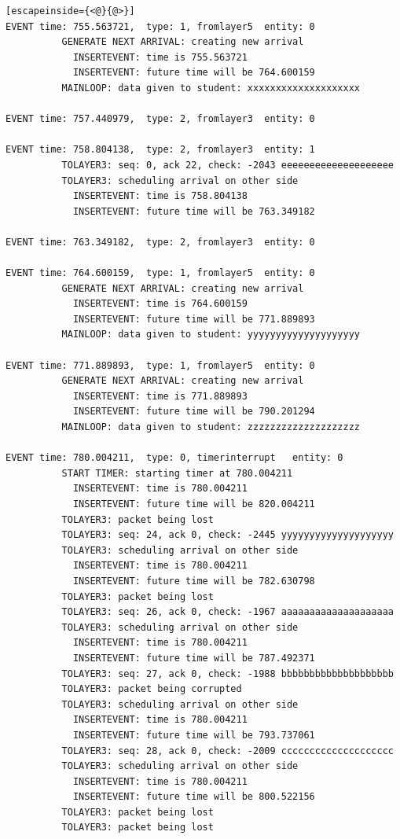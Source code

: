 \documentclass[paper=a4, fontsize=11pt]{scrartcl}
\numberwithin{equation}{section}		%
\numberwithin{figure}{section}			%
\numberwithin{table}{section}				%
\begin{document}
\begin{lstlisting}[escapeinside={<@}{@>}]
EVENT time: 755.563721,  type: 1, fromlayer5  entity: 0
          GENERATE NEXT ARRIVAL: creating new arrival
            INSERTEVENT: time is 755.563721
            INSERTEVENT: future time will be 764.600159
          MAINLOOP: data given to student: xxxxxxxxxxxxxxxxxxxx

EVENT time: 757.440979,  type: 2, fromlayer3  entity: 0

EVENT time: 758.804138,  type: 2, fromlayer3  entity: 1
          TOLAYER3: seq: 0, ack 22, check: -2043 eeeeeeeeeeeeeeeeeeee
          TOLAYER3: scheduling arrival on other side
            INSERTEVENT: time is 758.804138
            INSERTEVENT: future time will be 763.349182

EVENT time: 763.349182,  type: 2, fromlayer3  entity: 0

EVENT time: 764.600159,  type: 1, fromlayer5  entity: 0
          GENERATE NEXT ARRIVAL: creating new arrival
            INSERTEVENT: time is 764.600159
            INSERTEVENT: future time will be 771.889893
          MAINLOOP: data given to student: yyyyyyyyyyyyyyyyyyyy

EVENT time: 771.889893,  type: 1, fromlayer5  entity: 0
          GENERATE NEXT ARRIVAL: creating new arrival
            INSERTEVENT: time is 771.889893
            INSERTEVENT: future time will be 790.201294
          MAINLOOP: data given to student: zzzzzzzzzzzzzzzzzzzz

EVENT time: 780.004211,  type: 0, timerinterrupt   entity: 0
          START TIMER: starting timer at 780.004211
            INSERTEVENT: time is 780.004211
            INSERTEVENT: future time will be 820.004211
          TOLAYER3: packet being lost
          TOLAYER3: seq: 24, ack 0, check: -2445 yyyyyyyyyyyyyyyyyyyy
          TOLAYER3: scheduling arrival on other side
            INSERTEVENT: time is 780.004211
            INSERTEVENT: future time will be 782.630798
          TOLAYER3: packet being lost
          TOLAYER3: seq: 26, ack 0, check: -1967 aaaaaaaaaaaaaaaaaaaa
          TOLAYER3: scheduling arrival on other side
            INSERTEVENT: time is 780.004211
            INSERTEVENT: future time will be 787.492371
          TOLAYER3: seq: 27, ack 0, check: -1988 bbbbbbbbbbbbbbbbbbbb
          TOLAYER3: packet being corrupted
          TOLAYER3: scheduling arrival on other side
            INSERTEVENT: time is 780.004211
            INSERTEVENT: future time will be 793.737061
          TOLAYER3: seq: 28, ack 0, check: -2009 cccccccccccccccccccc
          TOLAYER3: scheduling arrival on other side
            INSERTEVENT: time is 780.004211
            INSERTEVENT: future time will be 800.522156
          TOLAYER3: packet being lost
          TOLAYER3: packet being lost


\end{lstlisting}
\end{document}

